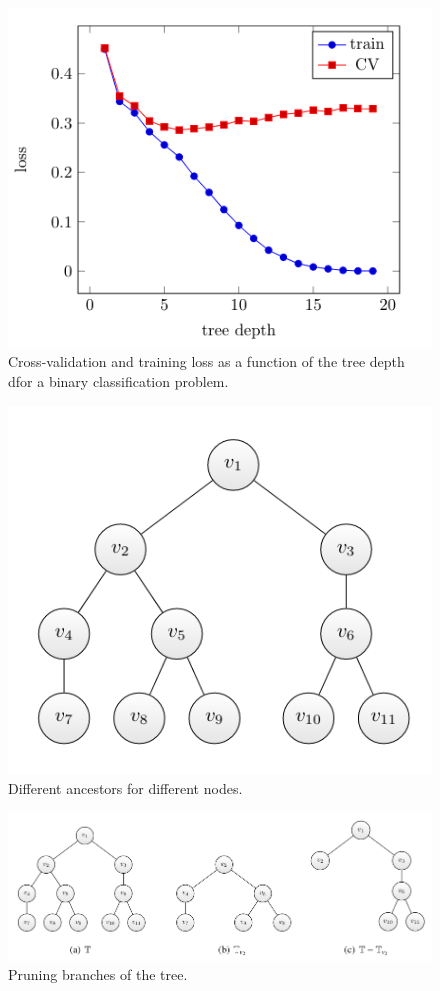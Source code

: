 \documentclass{beamer}
\begin{document}
\begin{frame}
    \begin{figure}
        \includegraphics[width=0.7\linewidth]{F86Kroese}
        \caption{Cross-validation and training loss as a function of the tree depth dfor a binary classification problem.\cite{kroese2020}}
    \end{figure}
\end{frame}

\begin{frame}
    \begin{figure}
        \includegraphics[width=0.7\linewidth]{F87Kroese}
        \caption{Different ancestors for different nodes.\cite{kroese2020}}
    \end{figure}
\end{frame}

\begin{frame}
    \begin{figure}
        \includegraphics[width=0.9\linewidth]{F88Kroese}
        \caption{Pruning branches of the tree.\cite{kroese2020}}
    \end{figure}
\end{frame}
\end{document}
